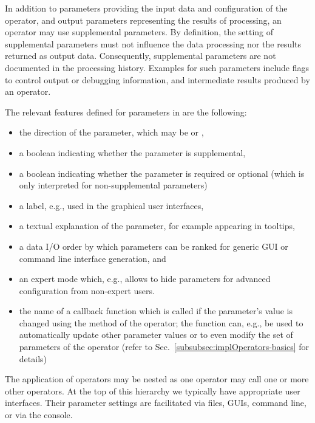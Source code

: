 
In addition to parameters providing the input data and configuration of the
operator, and output parameters representing the results of processing, an
operator may use supplemental parameters.  
By definition, the setting of supplemental parameters must not influence the
data processing nor the results returned as output data.
Consequently, supplemental parameters are not documented in the processing
history.
Examples for such parameters include flags to control output or debugging
information, and intermediate results produced by an operator.

The relevant features defined for parameters in \alida are the following:
\begin{itemize}
\item	the direction of the parameter, which may be  or ,
\item	a boolean indicating whether the parameter is supplemental, 
\item	a boolean indicating whether the parameter is required or optional
	(which is only interpreted for non-supplemental 
	parameters) 
\item	a label, e.g., used in the graphical user interfaces,
\item	a textual explanation of the parameter, for example appearing in tooltips,
\item   a data I/O order by which parameters can be ranked for generic GUI or
command line interface generation, and
\item   an expert mode which, e.g., allows to hide parameters for advanced configuration from non-expert users.
\item   the name of a callback function which is called if the parameter's value is changed using
	the  method of the operator; the function can, e.g., be used to
	automatically update other parameter values or to even modify the set of parameters of the
	operator (refer to Sec.~\ref{subsubsec:implOperators-basics} for details)
\end{itemize}

The application of operators may be nested as one operator may call one or more
other operators.
At the top of this hierarchy we typically have appropriate user interfaces.
Their parameter settings are facilitated via files, GUIs, command line, or
via the console.
